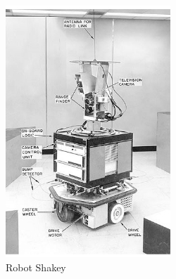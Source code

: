 \begin{figure}[ht!]
	\centering
	\begin{minipage}{0.35\linewidth}
		\centering
		\includegraphics[width=\linewidth]{figs/shakey.png}
		\caption*{\centering Robot Shakey} 
	\end{minipage}
	\hspace{2cm}
	\begin{minipage}{0.49\linewidth}
		\centering

\end{minipage}
\end{figure}
